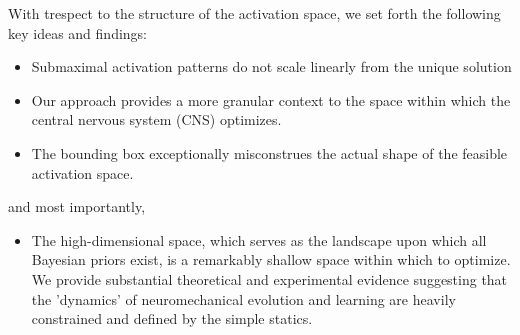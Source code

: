 With trespect to the structure of the activation space, we set forth the following key ideas and findings:
\begin{itemize}
\item {Submaximal activation patterns do not scale linearly from the unique solution}
\item {Our approach provides a more granular context to the space within which the central nervous system (CNS) optimizes.}
\item {The bounding box exceptionally misconstrues the actual shape of the feasible activation space.}
\end{itemize}
and most importantly,
\begin{itemize}
\item {The high-dimensional space, which serves as the landscape upon which all Bayesian priors exist, is a remarkably shallow space within which to optimize. We provide substantial theoretical and experimental evidence suggesting that the 'dynamics' of neuromechanical evolution and learning are heavily constrained and defined by the simple statics.}
\end{itemize}


